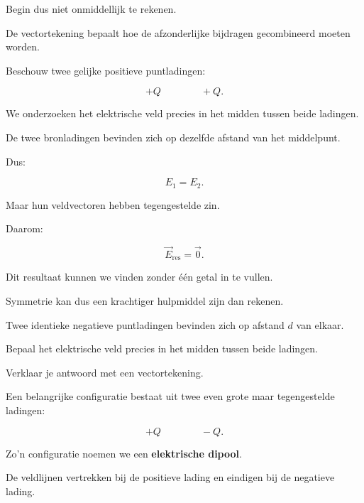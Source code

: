 \documentclass{ximera}
\begin{document}
Begin dus niet onmiddellijk te rekenen.

De vectortekening bepaalt hoe de afzonderlijke bijdragen gecombineerd
moeten worden.




Beschouw twee gelijke positieve puntladingen:

\[
+Q
\qquad\qquad
+Q.
\]

We onderzoeken het elektrische veld precies in het midden tussen beide
ladingen.

De twee bronladingen bevinden zich op dezelfde afstand van het
middelpunt.

Dus:

\[
E_1=E_2.
\]

Maar hun veldvectoren hebben tegengestelde zin.

Daarom:

\[
\boxed{
\vec E_\mathrm{res}=\vec 0.
}
\]


Dit resultaat kunnen we vinden zonder één getal in te vullen.

Symmetrie kan dus een krachtiger hulpmiddel zijn dan rekenen.


\begin{oefening}[Symmetrie]{\oefU\ESS}

Twee identieke negatieve puntladingen bevinden zich op afstand $d$ van
elkaar.

Bepaal het elektrische veld precies in het midden tussen beide
ladingen.

Verklaar je antwoord met een vectortekening.

\end{oefening}




Een belangrijke configuratie bestaat uit twee even grote maar
tegengestelde ladingen:

\[
+Q
\qquad\qquad
-Q.
\]

Zo'n configuratie noemen we een \textbf{elektrische dipool}.

De veldlijnen vertrekken bij de positieve lading en eindigen bij de
negatieve lading.
\end{document}
